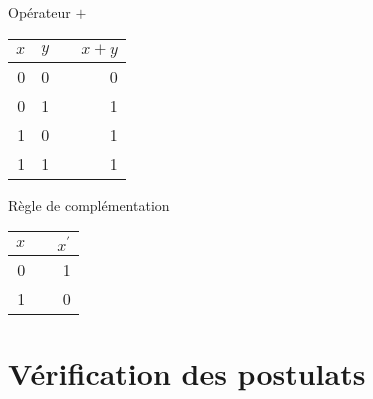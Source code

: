 \documentclass[letter, oneside]{book}
\begin{document}
Opérateur \(+\)

\begin{center}
\begin{tabular}{rrlr}
\(x\) & \(y\) &  & \(x + y\)\\[0pt]
\hline
0 & 0 &  & 0\\[0pt]
0 & 1 &  & 1\\[0pt]
1 & 0 &  & 1\\[0pt]
1 & 1 &  & 1\\[0pt]
\end{tabular}
\end{center}

Règle de complémentation

\begin{center}
\begin{tabular}{rlr}
\(x\) &  & \(x^{\prime}\)\\[0pt]
\hline
0 &  & 1\\[0pt]
1 &  & 0\\[0pt]
\end{tabular}
\end{center}


\section{Vérification des postulats}
\label{sec:org579b16c}
\end{document}
